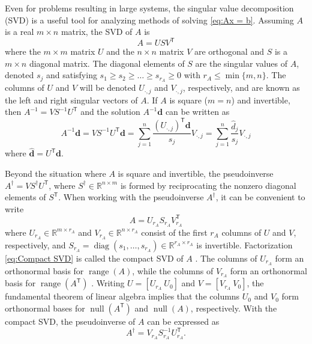 \documentclass[12pt]{article}
\newcommand{\mA}{m}	%
\newcommand{\rA}{r_A}	%
\newcommand{\dVec}{\mathbf{d}}	%
\newcommand{\trans}[1]{{#1}^\mathsf{T}}	%
\newcommand{\inv}[1]{{#1}^{-1}}	%
\newcommand{\pinv}[1]{{#1}^\dagger}	%
\DeclareMathOperator{\diag}{diag}	%
\DeclareMathOperator{\range}{range}	%
\DeclareMathOperator{\nullspace}{null}	%
\newcommand{\singular}{s}	%
\newcommand{\svd}[1]{\widehat{#1}}	%
\begin{document}
Even for problems resulting in large systems, the singular value decomposition (SVD) is a useful tool for analyzing methods of solving \eqref{eq:Ax = b}.  Assuming $A$ is a real $\mA \times n$ matrix, the SVD of $A$ is
\begin{equation}
\label{eq:SVD}
A = US\trans{V}
\end{equation}
where the $\mA \times \mA$ matrix $U$ and the $n \times n$ matrix $V$ are orthogonal and $S$ is a $\mA \times n$ diagonal matrix. The diagonal elements of $S$ are the singular values of $A$, denoted $\singular_j$ and satisfying $\singular_1 \geq \singular_2 \geq \ldots \geq \singular_{\rA} \geq 0$ with $\rA \leq \min\{\mA,n\}$. The columns of $U$ and $V$ will be denoted $U_{\cdot,j}$ and $V_{\cdot,j}$, respectively, and are known as the left and right singular vectors of $A$. If $A$ is square ($\mA = n$) and invertible, then $\inv{A} = V\inv{S}\trans{U}$ and the solution $\inv{A}\dVec$ can be written as
\begin{equation}
\label{eq:InvProd}
\inv{A}\dVec = VS^{-1}{\trans{U}}\dVec = \sum_{j=1}^{n} \frac{{\trans{(U_{\cdot,j})}}\dVec}{\singular_j}V_{\cdot,j} = \sum_{j=1}^{n} \frac{\svd{d}_j}{\singular_j}V_{\cdot,j}
\end{equation}
where $\svd{\dVec} = \trans{U}\dVec$. \par 
Beyond the situation where $A$ is square and invertible, the pseudoinverse $\pinv{A} = V\pinv{S}\trans{U}$, where $\pinv{S} \in \mathbb{R}^{n \times \mA}$ is formed by reciprocating the nonzero diagonal elements of $\trans{S}$. When working with the pseudoinverse $\pinv{A}$, it can be convenient to write
\begin{equation}
\label{eq:Compact SVD}
A = U_{\rA}S_{\rA}\trans{V}_{\rA}
\end{equation}
where $U_{\rA} \in \mathbb{R}^{\mA \times \rA}$ and $V_{\rA} \in \mathbb{R}^{n \times \rA}$ consist of the first $\rA$ columns of $U$ and $V$, respectively, and $S_{\rA} = \diag(\singular_1,\ldots,\singular_{\rA}) \in \mathbb{R}^{\rA \times \rA}$ is invertible. Factorization \eqref{eq:Compact SVD} is called the compact SVD of $A$ \cite{ABT,Leon2010}. The columns of $U_{\rA}$ form an orthonormal basis for $\range(A)$, while the columns of $V_{\rA}$ form an orthonormal basis for $\range(\trans{A})$ \cite[p.~340]{Leon2010}. Writing $U = [U_{\rA} ~ U_0]$ and $V = [V_{\rA} ~ V_0]$, the fundamental theorem of linear algebra \cite{Strang1993} implies that the columns $U_0$  and $V_0$ form orthonormal bases for $\nullspace(\trans{A})$ and $\nullspace(A)$, respectively. With the compact SVD, the pseudoinverse of $A$ can be expressed as 
\begin{equation}
\label{eq:Pseudoinverse}
    \pinv{A} = V_{\rA}\inv{S}_{\rA}\trans{U}_{\rA}.
\end{equation}
\end{document}
